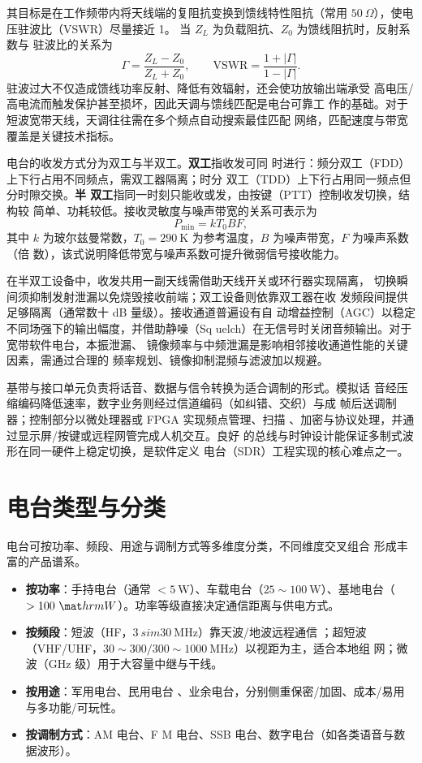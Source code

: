 其目标是在工作频带内将天线端的复阻抗变换到馈线特性阻抗（常用 $
50\ \Omega$），使电压驻波比（VSWR）尽量接近 1。
当 $Z_L$ 为负载阻抗、$Z_0$ 为馈线阻抗时，反射系数与
驻波比的关系为
\begin{equation}
\Gamma = \frac{Z_L-Z_0}{Z_L+Z_0}, \qquad \mathrm{VSWR} = \frac{1+|\Gamma|}{1-|\Gamma|}.
\end{equation}
驻波过大不仅造成馈线功率反射、降低有效辐射，还会使功放输出端承受
高电压/高电流而触发保护甚至损坏，因此天调与馈线匹配是电台可靠工
作的基础。对于短波宽带天线，天调往往需在多个频点自动搜索最佳匹配
网络，匹配速度与带宽覆盖是关键技术指标。

电台的收发方式分为双工与半双工。\textbf{双工}指收发可同
时进行：频分双工（FDD）上下行占用不同频点，需双工器隔离；时分
双工（TDD）上下行占用同一频点但分时隙交换。\textbf{半
双工}指同一时刻只能收或发，由按键（PTT）控制收发切换，结构较
简单、功耗较低。接收灵敏度与噪声带宽的关系可表示为
\begin{equation}
P_{\min} = k T_0 B F,
\end{equation}
其中 $k$ 为玻尔兹曼常数，$T_0=290\ \mathrm
{K}$ 为参考温度，$B$ 为噪声带宽，$F$ 为噪声系数（倍
数），该式说明降低带宽与噪声系数可提升微弱信号接收能力。

在半双工设备中，收发共用一副天线需借助天线开关或环行器实现隔离，
切换瞬间须抑制发射泄漏以免烧毁接收前端；双工设备则依靠双工器在收
发频段间提供足够隔离（通常数十 dB 量级）。接收通道普遍设有自
动增益控制（AGC）以稳定不同场强下的输出幅度，并借助静噪（Sq
uelch）在无信号时关闭音频输出。对于宽带软件电台，本振泄漏、
镜像频率与中频泄漏是影响相邻接收通道性能的关键因素，需通过合理的
频率规划、镜像抑制混频与滤波加以规避。

基带与接口单元负责将话音、数据与信令转换为适合调制的形式。模拟话
音经压缩编码降低速率，数字业务则经过信道编码（如纠错、交织）与成
帧后送调制器；控制部分以微处理器或 FPGA 实现频点管理、扫描
、加密与协议处理，并通过显示屏/按键或远程网管完成人机交互。良好
的总线与时钟设计能保证多制式波形在同一硬件上稳定切换，是软件定义
电台（SDR）工程实现的核心难点之一。

\section{电台类型与分类}
\label{sec:radio_station_types}

电台可按功率、频段、用途与调制方式等多维度分类，不同维度交叉组合
形成丰富的产品谱系。

\begin{itemize}
    \item \textbf{按功率}：手持电台（通常 $
<5\ \mathrm{W}$）、车载电台（$25\sim 10
0\ \mathrm{W}$）、基地电台（$>100\ \mat
hrm{W}$）。功率等级直接决定通信距离与供电方式。
    \item \textbf{按频段}：短波（HF，$3\
sim 30\ \mathrm{MHz}$）靠天波/地波远程通信
；超短波（VHF/UHF，$30\sim 300/300\sim
 1000\ \mathrm{MHz}$）以视距为主，适合本地组
网；微波（GHz 级）用于大容量中继与干线。
    \item \textbf{按用途}：军用电台、民用电台
、业余电台，分别侧重保密/加固、成本/易用与多功能/可玩性。
    \item \textbf{按调制方式}：AM 电台、F
M 电台、SSB 电台、数字电台（如各类语音与数据波形）。
\end{itemize}

